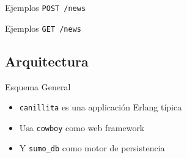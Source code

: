 \documentclass[utf8,hyperref={colorlinks=true}]{beamer}
\begin{document}
\begin{frame}{Ejemplos}
\alert{\texttt{POST /news}}
\postsample
{}\postsampleresp
\end{frame}

\begin{frame}{Ejemplos}
\alert{\texttt{GET /news}}
\getsample
{}
\getsampleresphh
{}\getsamplerespa
{}\getsamplerespb
\end{frame}

\subsection{Arquitectura}
\begin{frame}{Esquema General}
\begin{itemize}
	\item<+-> \texttt{canillita} es una applicaci\'on Erlang t\'ipica
	\item<+-> Usa \texttt{cowboy} como web framework
	\item<+-> Y \texttt{sumo\_db} como motor de persistencia
\end{itemize}
\end{frame}
\end{document}
